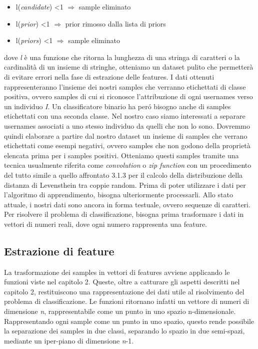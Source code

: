 \begin{itemize}
	\item l(\textit{candidate}) \textless 1 $\Rightarrow$ sample eliminato
	\item l(\textit{prior}) \textless 1 $\Rightarrow$ prior rimosso dalla lista di priors
	\item l(\textit{priors}) \textless 1 $\Rightarrow$ sample eliminato
\end{itemize}

dove \textit{l} è una funzione che ritorna la lunghezza di una stringa di caratteri o la cardinalità di un insieme di stringhe, otteniamo un dataset pulito che permetterà di evitare errori nella fase di estrazione delle features.\newline
I dati ottenuti rappresenteranno l'insieme dei nostri samples che verranno etichettati di classe positiva, ovvero samples di cui si riconosce l'attribuzione di ogni usernames verso un individuo \textit{I}. Un classificatore binario ha peró bisogno anche di samples etichettati con una seconda classe. Nel nostro caso siamo interessati a separare usernames associati a uno stesso individuo da quelli che non lo sono. Dovremmo quindi elaborare a partire dal nostro dataset un insieme di samples che verrano etichettati come esempi negativi, ovvero samples che non godono della proprietà elencata prima per i samples positivi. Otteniamo questi samples tramite una tecnica usualmente riferita come \textit{convolution} o \textit{zip function} con un procedimento del tutto simile a quello affrontato 3.1.3 per il calcolo della distribuzione della distanza di Levensthein tra coppie random. Prima di poter utilizzare i dati per l'algoritmo di apprendimento, bisogna ulteriormente processarli. Allo stato attuale, i nostri dati sono ancora in forma testuale, ovvero sequenze di caratteri. Per risolvere il problema di classificazione, bisogna prima trasformare i dati in vettori di numeri reali, dove ogni numero rappresenta una feature.

\subsection{Estrazione di feature}
La trasformazione dei samples in vettori di features avviene applicando le funzioni viste nel capitolo 2. Queste, oltre a catturare gli aspetti descritti nel capitolo 2, restituiscono una rappresentazione dei dati utile al risolvimento del problema di classificazione. Le funzioni ritornano infatti un vettore di numeri di dimensione \textit{n}, rappresentabile come un punto in uno spazio n-dimensionale. Rappresentando ogni sample come un punto in uno spazio, questo rende possibile la separazione dei samples in due classi, separando lo spazio in due semi-spazi, mediante un iper-piano di dimensione \textit{n}-1.

